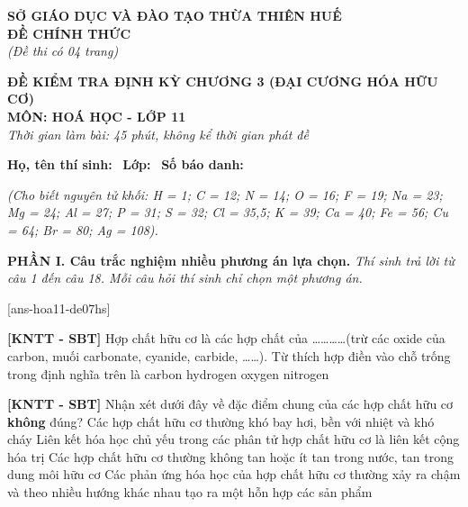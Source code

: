 \documentclass[12pt,a4paper]{article}
\begin{document}
\thispagestyle{firstpage}

\noindent
\begin{minipage}[t]{0.44\textwidth}
	\centering\fontsize{10pt}{12pt}\selectfont
	\textbf{SỞ GIÁO DỤC VÀ ĐÀO TẠO THỪA THIÊN HUẾ}\\
	\textbf{ĐỀ CHÍNH THỨC}\\
	\textit{(Đề thi có 04 trang)}
\end{minipage}\hfill
\begin{minipage}[t]{0.54\textwidth}
	\centering\fontsize{10.5pt}{13pt}\selectfont
	\textbf{ĐỀ KIỂM TRA ĐỊNH KỲ CHƯƠNG 3 (ĐẠI CƯƠNG HÓA HỮU CƠ)}\\
	\textbf{MÔN: HOÁ HỌC - LỚP 11}\\
	\textit{Thời gian làm bài: 45 phút, không kể thời gian phát đề}
	
	\smallskip
\end{minipage}

\smallskip
\noindent\hrulefill
\smallskip

\noindent\textbf{Họ, tên thí sinh:} \dotfill\ \textbf{Lớp:} \dotfill\ \textbf{Số báo danh:} \dotfill

\smallskip
\noindent\textit{(Cho biết nguyên tử khối: H = 1; C = 12; N = 14; O = 16; F = 19; Na = 23; Mg = 24; Al = 27; P = 31; S = 32; Cl = 35,5; K = 39; Ca = 40; Fe = 56; Cu = 64; Br = 80; Ag = 108).}
\smallskip

\noindent\textbf{\large PHẦN I. Câu trắc nghiệm nhiều phương án lựa chọn.}
\textit{Thí sinh trả lời từ câu 1 đến câu 18. Mỗi câu hỏi thí sinh chỉ chọn một phương án.}
\vspace{0.2cm}

[ans-hoa11-de07hs]

\begin{ex}
\textbf{[KNTT - SBT]} Hợp chất hữu cơ là các hợp chất của \dots\dots\dots\dots (trừ các oxide của carbon, muối carbonate, cyanide, carbide, \dots\dots). Từ thích hợp điền vào chỗ trống trong định nghĩa trên là
\choice
{\True carbon}
{hydrogen}
{oxygen}
{nitrogen}

\end{ex}

\begin{ex}
\textbf{[KNTT - SBT]} Nhận xét dưới đây về đặc điểm chung của các hợp chất hữu cơ \textbf{không} đúng?
\choice
{\True Các hợp chất hữu cơ thường khó bay hơi, bền với nhiệt và khó cháy}
{Liên kết hóa học chủ yếu trong các phân tử hợp chất hữu cơ là liên kết cộng hóa trị}
{Các hợp chất hữu cơ thường không tan hoặc ít tan trong nước, tan trong dung môi hữu cơ}
{Các phản ứng hóa học của hợp chất hữu cơ thường xảy ra chậm và theo nhiều hướng khác nhau tạo ra một hỗn hợp các sản phẩm}

\end{ex}
\end{document}
